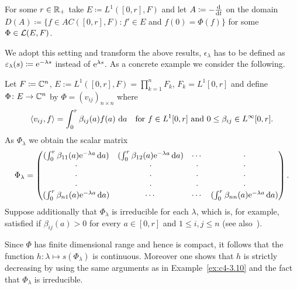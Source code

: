 For some $r \in \mathbb{R}_{+}$ take $E \coloneqq L^{1}([0,r], F)$ and let $A \coloneqq - \frac{\mathop{}\!\mathrm{d}{}}{\mathop{}\!\mathrm{d}{t}}$ on the domain $D(A) \coloneqq \{f \in AC([0,r], F) \colon f' \in E$ and $f(0) = \Phi(f)\}$ for some $\Phi \in \mathcal{L}(E,F)$.

We adopt this setting and transform the above results, \eg $\epsilon_{\lambda}$ has to be defined as $\epsilon_{\lambda}(s) \coloneqq \eu^{-\lambda s}$ instead of\/ $\mathrm{e}^{\lambda s}$.
As a concrete example we consider the following.


\begin{example}\label{ex:c4-3.12}
%
%
Let $F \coloneqq \mathbb{C}^{n}$, $E:= L^{1}([0,r],F) = \prod_{k=1}^{n} F_{k}$, $F_{k} = L^{1}[0,r]$ and define $\Phi \colon E \to \mathbb{C}^{n}$ by $\Phi = (v_{ij})_{{n\times n}}$ where
\[
\langle v_{ij}, f \rangle = \int_{0}^{r} \beta_{ij}(a)f(a) \, \diff{a} \quad \text{for } f \in L^{1}[0,r] \text{ and } 0 \leq \beta_{ij} \in L^{\infty}[0,r]  .
\]
As $\Phi_{\lambda}$ we obtain the scalar matrix
\begin{equation*}\label{eq:c4-3.12-kgk2}
\Phi_{\lambda} = \begin{pmatrix}
(\int_0^r \beta_{11}(a)\mathrm{e}^{-\lambda a}\mathop{}\!\mathrm{d}{a}) & (\int_0^r \beta_{12}(a)\mathrm{e}^{-\lambda a}\mathop{}\!\mathrm{d}{a}) & \cdots & \cdot \\
\cdot & \cdot & \cdot & \cdot \\
\cdot & \cdot & \cdot & \cdot \\
\cdot & \cdot & \cdot & \cdot \\
(\int_0^r \beta_{n1}(a)\mathrm{e}^{-\lambda a}\mathop{}\!\mathrm{d}{a}) & \cdots & \cdots & (\int_0^r \beta_{nn}(a)\mathrm{e}^{-\lambda a}\mathop{}\!\mathrm{d}{a})
\end{pmatrix} . 
\end{equation*}
Suppose additionally that $\Phi_{\lambda}$ is irreducible for each $\lambda$, which is, for example, satisfied if\/ $\beta_{ij}(a) > 0$ for every $a \in [0,r]$ and $1 \leq i,j \leq n$ (see also \textcite[p.257ff]{bellmancooke:1963}\,).

Since $\Phi$ has finite dimensional range and hence is compact, it follows that the function $h \colon \lambda \mapsto s(\Phi_{\lambda})$ is continuous.
Moreover one shows that $h$ is strictly decreasing by using the same arguments as in Example~\ref{ex:c4-3.10} and the fact that $\Phi_{\lambda}$ is irreducible.


\end{example}

